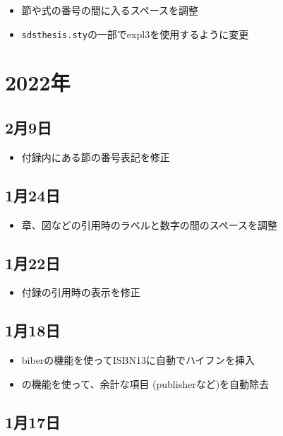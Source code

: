 \begin{itemize}
  \item 節や式の番号の間に入るスペースを調整
  \item \texttt{sdsthesis.sty}の一部でexpl3を使用するように変更
\end{itemize}

\section*{2022年}

\subsection*{2月9日}

\begin{itemize}
  \item 付録内にある節の番号表記を修正
\end{itemize}

\subsection*{1月24日}

\begin{itemize}
  \item 章、図などの引用時のラベルと数字の間のスペースを調整
\end{itemize}

\subsection*{1月22日}

\begin{itemize}
  \item 付録の引用時の表示を修正
\end{itemize}

\subsection*{1月18日}

\begin{itemize}
  \item biberの機能を使ってISBN13に自動でハイフンを挿入
  \item \biblatex の機能を使って、余計な項目 (publisherなど)を自動除去
\end{itemize}

\subsection*{1月17日}

